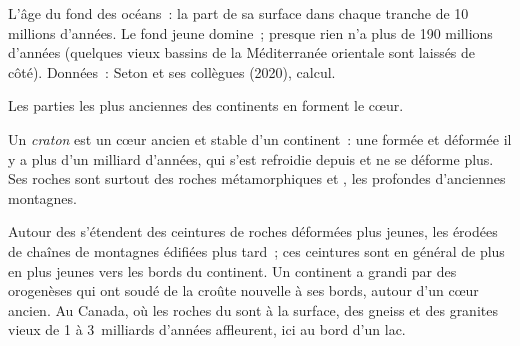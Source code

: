 \begin{omfigure}

{\small L'âge du fond des océans~: la part de sa surface dans chaque
tranche de 10 millions d'années. Le fond jeune domine~; presque rien n'a
plus de 190 millions d'années (quelques vieux bassins de la Méditerranée
orientale sont laissés de côté). Données~: Seton et ses collègues (2020),
calcul.}
\end{omfigure}

Les parties les plus anciennes des continents en forment le cœur.

\begin{definition}[Craton]\label{def:g12:continental-crust:craton}
Un \emph{craton} est un cœur ancien et stable d'un
continent~: une  formée et déformée il y a plus d'un
milliard d'années, qui s'est refroidie depuis et ne se déforme plus. Ses
roches sont surtout des roches métamorphiques et , les 
profondes d'anciennes montagnes.
\end{definition}

Autour des  s'étendent des ceintures de roches déformées plus
jeunes, les  érodées de chaînes de montagnes édifiées plus tard~;
ces ceintures sont en général de plus en plus jeunes vers les bords du
continent. Un continent a grandi par des orogenèses qui ont soudé de la
croûte nouvelle à ses bords, autour d'un cœur ancien. Au Canada, où les
roches du  sont à la surface, des gneiss et des granites vieux de 1 à
3~milliards d'années affleurent, ici au bord d'un lac.

